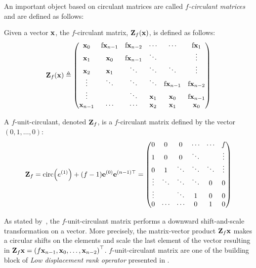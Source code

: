 An important object based on circulant matrices are called \emph{$f$-circulant matrices} and are defined as follows:
\begin{definition}
  Given a vector $\mathbf{x}$, the $f$-circulant matrix, $\mathbf{Z}_f(\mathbf{x})$, is defined as follows:
  \begin{equation}
    \Zmat_f(\xvec) \triangleq
    \leftmatrix
      \xvec_0 & $f$ \xvec_{n-1} & $f$ \xvec_{n-2} & \cdots & \cdots & $f$ \xvec_{1} \\
      \xvec_{1} & \xvec_0 & $f$ \xvec_{n-1} & \ddots & & \vdots \\
      \xvec_{2} & \xvec_{1} & \ddots & \ddots & \ddots & \vdots \\ 
      \vdots & \ddots & \ddots & \ddots & $f$ \xvec_{n-1} & $f$ \xvec_{n-2} \\
      \vdots & & \ddots & \xvec_{1} & \xvec_{0} & $f$ \xvec_{n-1} \\
      \xvec_{n-1} & \cdots & \cdots & \xvec_{2} & \xvec_{1} & \xvec_0
    \rightmatrix
  \end{equation}
  \label{definition:ch2-f_circulant_matrix}
\end{definition}
\noindent
A $f$-unit-circulant, denoted $\mathbf{Z}_f$, is a $f$-circulant matrix defined by the vector $\left(0, 1, \dots, 0 \right)$:
\begin{equation}
  \Zmat_f = \circulant \left(e^{(1)} \right) + (f - 1) \evec^{(0)} \evec^{(n-1)\top} = 
    \leftmatrix
      0      & 0      & 0      & \cdots & \cdots & f      \\
      1      & 0      & 0      & \ddots &        & \vdots \\
      0      & 1      & \ddots & \ddots & \ddots & \vdots \\ 
      \vdots & \ddots & \ddots & \ddots & 0      & 0      \\
      \vdots &        & \ddots & 1      & 0      & 0      \\
      0      & \cdots & \cdots & 0      & 1      & 0
    \rightmatrix
\end{equation}

\noindent
As stated by~\citet{sindhwani2015structured}, the $f$-unit-circulant matrix performs a downward shift-and-scale transformation on a vector.
More precisely, the matrix-vector product $\mathbf{Z}_f \mathbf{x}$ makes a circular shifts on the elements and scale the last element of the vector resulting in $\Zmat_f \xvec = \leftmat f \xvec_{n-1}, \xvec_0, \dots, \xvec_{n-2} \rightmat^\top$. 
$f$-unit-circulant matrix are one of the building block of \emph{Low displacement rank operator} presented in .


